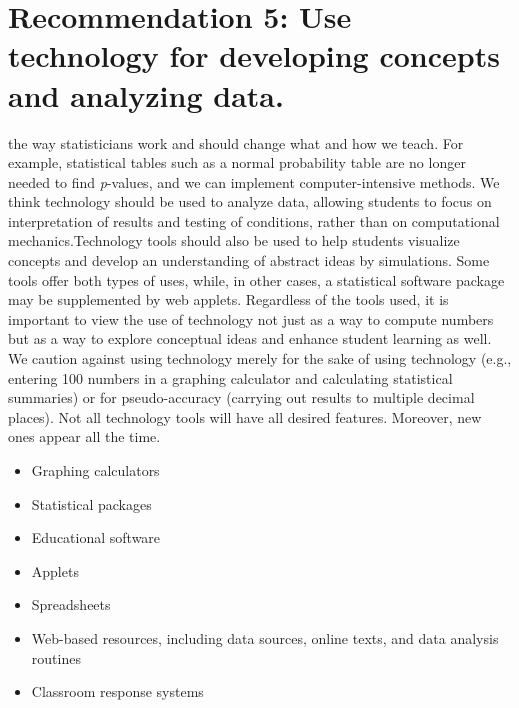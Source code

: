 \section{\textbf{Recommendation 5: Use technology for developing concepts and analyzing data.}}
 
  the way statisticians work and should change what and how we teach.  For example, statistical tables such as a normal probability table are no longer needed to find \textit{p}-values, and we can implement computer-intensive methods. We think technology should be used to analyze data, allowing students to focus on interpretation of results and testing of conditions, rather than on computational mechanics.Technology tools should also be used to help students visualize concepts and develop an understanding of abstract ideas by simulations. Some tools offer both types of uses, while, in other cases, a statistical software package may be supplemented by web applets. Regardless of the tools used, it is important to view the use of technology not just as a way to compute numbers but as a way to explore conceptual ideas and enhance student learning as well. We caution against using technology merely for the sake of using technology (e.g., entering 100 numbers in a graphing calculator and calculating statistical summaries) or for pseudo-accuracy (carrying out results to multiple decimal places). Not all technology tools will have all desired features. Moreover, new ones appear all the time.\\
\vspace{.2in}
 
\noindent{}

\renewcommand\labelitemi{$\filledsquare$}

\begin{itemize}[leftmargin=1cm, itemsep=.2em]
\item Graphing calculators
\item Statistical packages
\item Educational software
\item Applets
\item Spreadsheets
\item Web-based resources, including data sources, online texts, and data analysis routines
\item Classroom response systems
\end{itemize}
 
